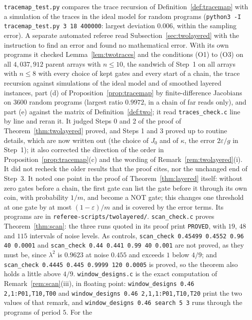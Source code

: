 \documentclass[11pt]{amsart}
\theoremstyle{definition}
\theoremstyle{remark}
\newcommand{\eps}{\varepsilon}
\begin{document}
\texttt{tracemap\_test.py} compares the trace recursion of Definition~\ref{def:tracemap} with a
simulation of the traces in the ideal model for random programs
(\texttt{python3 -I tracemap\_test.py 3 18 400000}: largest deviation $0.006$, within the
sampling error). A separate automated referee read Subsection~\ref{sec:twolayered} with the
instruction to find an error and found no mathematical error. With its own programs it checked
Lemma~\ref{lem:twotraces} and the conditions (O1) to (O3) on all $4{,}037{,}912$ parent arrays
with $n\le10$, the sandwich of Step~1 on all arrays with $n\le8$ with every choice of kept
gates and every start of a chain, the trace recursion against simulations of the ideal model
and of smoothed layered instances, part (d) of Proposition~\ref{prop:tracemap} by
finite-difference Jacobians on $3600$ random programs (largest ratio $0.9972$, in a chain of far
reads only), and part (e) against the matrix of Definition~\ref{def:two}; it read
\texttt{traces\_check.c} line by line and reran it. It judged Steps 0 and 2 of the proof of
Theorem~\ref{thm:twolayered} proved, and Steps 1 and 3 proved up to routine details, which are
now written out (the choice of $J_0$ and of $\kappa$, the error $2\eps/g$ in Step~1); it also
corrected the direction of the order in Proposition~\ref{prop:tracemap}(c) and the wording of
Remark~\ref{rem:twolayered}(i). It did not recheck the older results that the proof cites, nor
the unchanged end of Step~3. It noted one point in the proof of Theorem~\ref{thm:layered}
itself: without zero gates before a chain, the first gate can list the gate before it through
its own coin, with probability $1/m$, and become a NOT gate; this changes one threshold at one
gate by at most $(1-\eps)/m$ and is covered by the error terms. Its programs are in
\texttt{referee-scripts/twolayered/}.
\texttt{scan\_check.c} proves Theorem~\ref{thm:scan}: the three runs quoted in its proof print
\texttt{PROVED}, with $19$, $48$ and $115$ intervals of noise levels. As controls,
\texttt{scan\_check 0.45499 0.4552 0.96 40 0.0001} and
\texttt{scan\_check 0.44 0.441 0.99 40 0.001} are not proved, as they must be, since
$\lambda^2$ is $0.9623$ at noise $0.455$ and exceeds $1$ below $4/9$; and
\texttt{scan\_check 0.4445 0.445 0.9999 120 0.0005} is proved, so the theorem also holds a
little above $4/9$. \texttt{window\_designs.c} is the exact computation of
Remark~\ref{rem:scan}(iii), in floating point: \texttt{window\_designs 0.46 2,1:P01,T10,T00}
and \texttt{window\_designs 0.46 2,1,1:P01,T10,T20} print the two values of that remark, and
\texttt{window\_designs 0.46 search 5 3} runs through the programs of period $5$. For the
\end{document}
